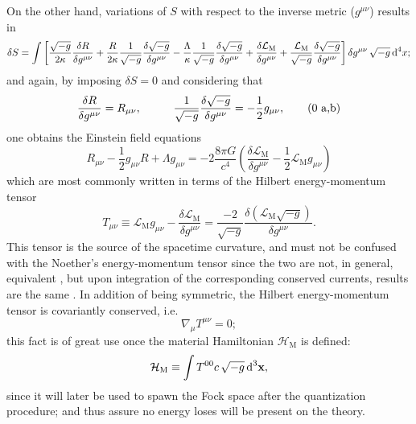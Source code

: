  
On the other hand, variations of $S$ with respect to the inverse metric ($g^{\mu\nu}$) results in
\begin{multline}
	\delta S=\int \left[\frac{\sqrt{-g}}{2\kappa}\frac{\delta R}{\delta g^{\mu\nu}}+\frac{R}{2\kappa}\frac{1}{\sqrt{-g}}\frac{\delta \sqrt{-g}}{\delta g^{\mu\nu}}-\frac{\Lambda}{\kappa}\frac{1}{\sqrt{-g}}\frac{\delta\sqrt{-g}}{\delta g^{\mu\nu}}+\frac{\delta\mathcal{L}_{\text{M}}}{\delta g^{\mu\nu}}+\frac{\mathcal{L}_{\text{M}}}{\sqrt{-g}}\frac{\delta\sqrt{-g}}{\delta g^{\mu\nu}}\right]\delta g^{\mu\nu}\,\sqrt{-g}\,\text{d}^4x;
\end{multline}
and again, by imposing $\delta S=0$ and considering that
\begin{subequations}
	\begin{gather}
		\frac{\delta R}{\delta g^{\mu\nu}}=R_{\mu\nu},\hspace{1.0cm}\frac{1}{\sqrt{-g}}\frac{\delta\sqrt{-g}}{\delta g^{\mu\nu}}=-\frac{1}{2}g_{\mu\nu},\tag{\theequation \,\,a,b}
	\end{gather}
\end{subequations}
one obtains the Einstein field equations
\begin{equation}\label{eq: Einstein Field Equations}
	R_{\mu\nu}-\frac{1}{2}g_{\mu\nu}R+\Lambda g_{\mu\nu}=-2\frac{8\pi G}{c^4}\left(\frac{\delta\mathcal{L}_{\text{M}}}{\delta g^{\mu\nu}}-\frac{1}{2}\mathcal{L}_{\text{M}}g_{\mu\nu}\right)
\end{equation}
which are most commonly written in terms of the Hilbert energy-momentum tensor
\begin{equation}\label{eq: Hilbert energy-momentum tensor}
	T_{\mu\nu}\equiv \mathcal{L}_{\text{M}}g_{\mu\nu}-\frac{\delta\mathcal{L}_{\text{M}}}{\delta g^{\mu\nu}}=\frac{-2}{\sqrt{-g}}\frac{\delta \left(\mathcal{L}_{\text{M}}\sqrt{-g}\right)}{\delta g^{\mu\nu}}.
\end{equation}
This tensor is the source of the spacetime curvature, and must not be confused with the Noether's energy-momentum tensor since the two are not, in general, equivalent \cite{Energy-MomentumTensor}, but upon integration of the corresponding conserved currents, results are the same \cite{NoetherVsHilbert}. In addition of being symmetric, the Hilbert energy-momentum tensor is covariantly conserved, i.e.
\begin{equation}
	\nabla_\mu T^{\mu\nu}=0;
\end{equation}
this fact is of great use once the material Hamiltonian $\mathcal{H}_{\text{M}}$ is defined:
\begin{equation}\label{eq: General Hamiltonian}
	\mathcal{H}_{\text{M}}\equiv \int T^{00}c\,\sqrt{-g}\,\text{d}^3\mathbf{x},
\end{equation}
since it will later be used to spawn the Fock space after the quantization procedure; and thus assure no energy loses will be present on the theory.
